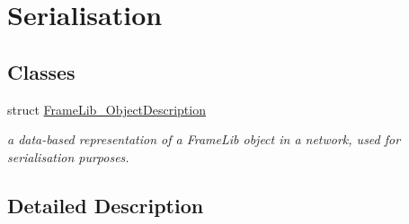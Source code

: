 \hypertarget{group___serialisation}{}\section{Serialisation}
\label{group___serialisation}
\subsection*{Classes}
\begin{DoxyCompactItemize}
\item 
struct \hyperlink{struct_frame_lib___object_description}{Frame\+Lib\+\_\+\+Object\+Description}
\begin{DoxyCompactList}\small\item\em a data-\/based representation of a Frame\+Lib object in a network, used for serialisation purposes. \end{DoxyCompactList}\end{DoxyCompactItemize}


\subsection{Detailed Description}
